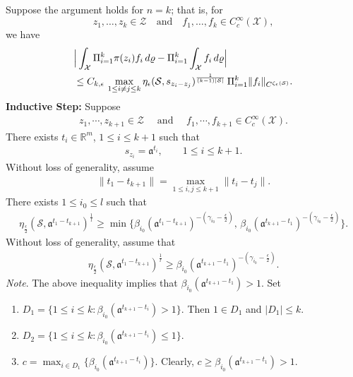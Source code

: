 \documentclass[11 pt]{amsart}
\makeatletter
\newcommand{\namedlabel}[2]{%
  \begingroup
  \def\@currentlabel{#2}%
  \label{#1}%
  \endgroup
}
\newcommand{\RR}{\mathbb{R}}
\newcommand{\norm}[1]{\lVert#1\rVert}
\theoremstyle{definition}
\numberwithin{equation}{section}
\makeatother
\begin{document}
Suppose the argument holds for $n=k$; that is, for
\[
z_1,\dots, z_k\in \mathcal{Z}\quad\text{and}\quad f_1,\dots, f_k\in C_c^{\infty}(\mathcal{X}),
\]
we have
\begin{align}\label{for:235}
 &\Big|\int_{\mathcal{X}} \Pi_{i=1}^{k} \pi(z_i)f_i \,d\varrho - \Pi_{i=1}^{k} \int_{\mathcal{X}} f_i \,d\varrho\Big|\notag\\
&\le C_{k,\epsilon}\,\max_{1\le i\neq j\le k}\eta_\epsilon (\mathcal{S}, s_{z_i-z_j})^{\frac{1}{(k-1)|\mathcal{S}|}}\,
\Pi_{i=1}^k\norm{f_i}_{C^{\zeta_{\epsilon}(\mathcal{S})}}.
\end{align}
\textbf{Inductive Step:} Suppose
\begin{align*}
z_1,\cdots,z_{k+1}\in \mathcal{Z}\quad\text{ and }\quad f_1,\cdots, f_{k+1}\in C_c^{\infty}(\mathcal{X}).
\end{align*}
There exists $t_i\in \RR^m$, $1\leq i\leq k+1$ such that
\begin{align*}
 s_{z_i}=\mathfrak{a}^{t_i},\qquad 1\leq i\leq k+1.
\end{align*}
Without loss of generality, assume
\begin{align}\label{for:136}
 \norm{t_1-t_{k+1}}=\max_{1\leq i,j\leq k+1} \norm{t_i-t_{j}}.
\end{align}
There exists $1\leq i_0\leq l$ such that
\begin{align*}
 \eta_{\frac{\epsilon}{2}} (\mathcal{S}, \mathfrak{a}^{t_1-t_{k+1}})^{\frac{1}{l}}\geq \min\{\beta_{i_0}(\mathfrak{a}^{t_{1}-t_{k+1}})^{-(\gamma_{i_0}-\frac{\epsilon}{2})},\,\beta_{i_0}(\mathfrak{a}^{t_{k+1}-t_{1}})^{-(\gamma_{i_0}-\frac{\epsilon}{2})}\}.
\end{align*}
Without loss of generality, assume that
\begin{align}\label{for:225}
\eta_{\frac{\epsilon}{2}} (\mathcal{S}, \mathfrak{a}^{t_1-t_{k+1}})^{\frac{1}{l}}\geq \beta_{i_0}(\mathfrak{a}^{t_{k+1}-t_{1}})^{-(\gamma_{i_0}-\frac{\epsilon}{2})}.
\end{align}
\emph{Note}. The above inequality implies that $\beta_{i_0}(\mathfrak{a}^{t_{k+1}-t_{1}})>1$.   Set
\begin{enumerate}
  \item [$(\mathcal{T}_1)$]\namedlabel{for:230}{$\mathcal{T}_1$} $D_1=\{1\leq i\leq k: \beta_{i_0}(\mathfrak{a}^{t_{k+1}-t_{i}})>1\}$. Then $1\in D_1$ and $|D_1|\leq k$.

  \smallskip
  \item [$(\mathcal{T}_2)$]\namedlabel{for:231}{$\mathcal{T}_2$} $D_2=\{1\leq i\leq k: \beta_{i_0}(\mathfrak{a}^{t_{k+1}-t_{i}})\leq 1\}.$
  \smallskip
  \item [$(\mathcal{T}_3)$]\namedlabel{for:226}{$\mathcal{T}_3$} $c=\max_{i\in D_1}\{\beta_{i_0}(\mathfrak{a}^{t_{k+1}-t_{i}})\}$. Clearly, $c\geq \beta_{i_0}(\mathfrak{a}^{t_{k+1}-t_{1}})>1$.
\end{enumerate}
\end{document}
